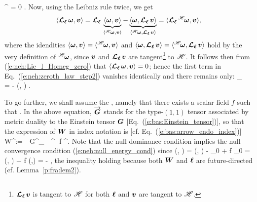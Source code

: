     \Lie{\el} {}^{\Hor}\!\w{\omega} = 0 .
\ee
Now, using the Leibniz rule twice, we get
\[
    \langle \bm{\mathcal{L}}_{\bm{\ell}}\, \bm{\omega}, \bm{v} \rangle = \bm{\mathcal{L}}_{\bm{\ell}}\,
    \underbrace{\langle \bm{\omega}, \bm{v} \rangle}_{\langle {}^{\mathscr{H}}\!\bm{\omega}, \bm{v} \rangle}
    - \underbrace{\langle \bm{\omega}, \bm{\mathcal{L}}_{\bm{\ell}}\, \bm{v} \rangle}_{\langle {}^{\mathscr{H}}\!\bm{\omega}, \bm{\mathcal{L}}_{\bm{\ell}}\, \bm{v} \rangle} = \langle \bm{\mathcal{L}}_{\bm{\ell}}\, {}^{\mathscr{H}}\!\bm{\omega}, \bm{v} \rangle ,
\]
where the idendities $\langle \bm{\omega}, \bm{v} \rangle = \langle {}^{\mathscr{H}}\!\bm{\omega}, \bm{v} \rangle$
and $\langle \bm{\omega}, \bm{\mathcal{L}}_{\bm{\ell}}\, \bm{v} \rangle =  \langle {}^{\mathscr{H}}\!\bm{\omega}, \bm{\mathcal{L}}_{\bm{\ell}}\, \bm{v} \rangle$
hold by the very definition of ${}^{\mathscr{H}}\!\bm{\omega}$,
since $\bm{v}$ and $\bm{\mathcal{L}}_{\bm{\ell}}\,\bm{v}$ are tangent\footnote{$\bm{\mathcal{L}}_{\bm{\ell}}\,\bm{v}$ is tangent to
$\mathscr{H}$ for both $\bm{\ell}$ and $\bm{v}$ are tangent to $\mathscr{H}$.}
to $\mathscr{H}$. It follows then from (\ref{e:neh:Lie_l_Homeg_zero}) that $\langle \bm{\mathcal{L}}_{\bm{\ell}}\, \bm{\omega}, \bm{v} \rangle = 0$; hence the
first term in Eq.~(\ref{e:neh:zeroth_law_step2}) vanishes identically and there remains
only:
\be \label{e:neh:DS_kappa_W}
    \wnab_{} \, \kappa = - (\wl, ) .
\ee

To go further, we shall assume the
 \cite{Racz08}, namely that there
exists a scalar field $f$ such that
\be \label{e:neh:null_dominant_cond}
   .
\ee
In the above equation, $\overrightarrow{\bm{G}}$ stands for the type-$(1,1)$ tensor
associated by metric duality to the Einstein tensor
$\bm{G}$ [Eq.~(\ref{e:bas:Einstein_tensor})], so that the expression of $\bm{W}$
in index notation is [cf. Eq.~(\ref{e:bas:arrow_endo_index})]
\be \label{e:neh:def_W_index}
    W^\alpha := - G^\alpha_{\ \, \mu} \el^\mu - f \ell^\alpha .
\ee
Note that the null dominance condition implies the null convergence condition
(\ref{e:neh:null_energy_cond}) since
\be \label{e:neh:R_ll_W_l}
    (\wl, \wl) = (\wl, \wl) -  _{0}
    + f _{0}  =  (\wl, \wl) + f (\wl,\wl)
     =  - \cdot\wl {} ,
\ee
the inequality holding because both $\bm{W}$ and $\bm{\ell}$ are future-directed
(cf. Lemma~\ref{p:fra:lem2}).

